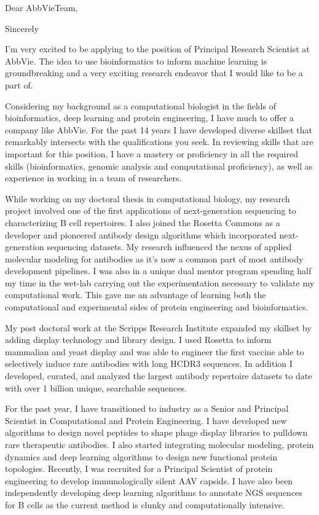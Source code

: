 \documentclass[11pt,a4paper,sans]{moderncv}        %
\title{}                               %
\newcommand{\Position}{Principal Research Scientist }
\newcommand{\Company}{AbbVie}
\newcommand{\CompanyLoc}{Cambridge}
\newcommand{\CompanyState}{MA}
\newcommand{\Personal}{The idea to use bioinformatics to inform machine learning is groundbreaking and a very exciting research endeavor that I would like to be a part of.}
\newcommand{\skills}{bioinformatics, genomic analysis and computational proficiency}
\begin{document}
\recipient{\Company Team}{\CompanyLoc \\ \CompanyLoc, \CompanyState}
\date{2020}
\opening{Dear \Company Team,}
\closing{Sincerely}
\makelettertitle
\justify
I'm very excited to be applying to the position of \Position at \Company. \Personal

Considering my background as a computational biologist in the fields of bioinformatics, deep learning and protein engineering, I have much to offer a company like \Company.
For the past 14 years I have developed diverse skillset that remarkably intersects with the qualifications you seek. In reviewing skills that are important for this position, I have a mastery or proficiency in all the required skills (\skills), as well as experience in working in a team of researchers.

While working on my doctoral thesis in computational biology, my research project involved one of the first applications of next-generation sequencing to characterizing B cell repertoires. 
I also joined the Rosetta Commons as a developer and pioneered antibody design algorithms which incorporated next-generation sequencing datasets. My research influenced the nexus of applied molecular modeling for antibodies as it's now a common part of most antibody development pipelines. I was also in a unique dual mentor program spending half my time in the wet-lab carrying out the experimentation necessary to validate my computational work. This gave me an advantage of learning both the computational and experimental sides of protein engineering and bioinformatics.

My post doctoral work at the Scripps Research Institute expanded my skillset by adding display technology and library design. I used Rosetta to inform mammalian and yeast  display and was able to engineer the first vaccine able to selectively induce rare antibodies with long HCDR3 sequences.  In addition I developed, curated, and analyzed the largest antibody repertoire datasets to date with over 1 billion unique, searchable sequences.

For the past year, I have transitioned to industry as a Senior and Principal Scientist in Computational and Protein Engineering. I have developed new algorithms to design novel peptides to shape phage display libraries to pulldown rare therapeutic antibodies. I also started integrating molecular modeling, protein dynamics and deep learning algorithms to design new functional protein topologies. Recently, I was recruited for a Principal Scientist of protein engineering to develop immunologically silent AAV capsids. I have also been independently developing deep learning algorithms to annotate NGS sequences for B cells as the current method is clunky and computationally intensive.
\end{document}
